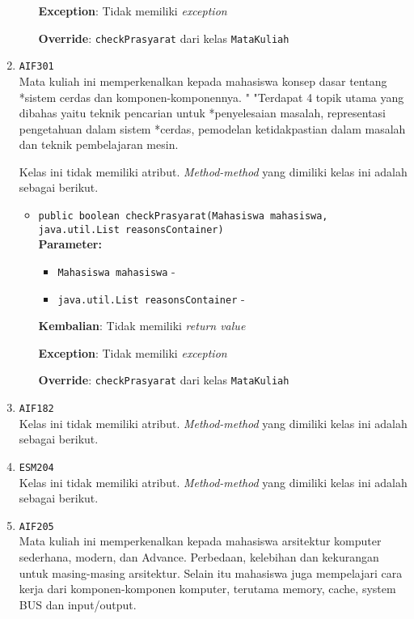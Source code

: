 \documentclass{article}
\begin{document}
\begin{enumerate}
\begin{itemize}
\textbf{Exception}: Tidak memiliki \textit{exception}

\textbf{Override}: \texttt{checkPrasyarat} dari kelas \texttt{MataKuliah}

\end{itemize}
\item \texttt{AIF301}\\ 
Mata kuliah ini memperkenalkan kepada mahasiswa konsep dasar tentang *sistem
 cerdas dan komponen-komponennya. " "Terdapat 4 topik utama yang dibahas yaitu
 teknik pencarian untuk *penyelesaian masalah, representasi pengetahuan dalam
 sistem *cerdas, pemodelan ketidakpastian dalam masalah dan teknik
 pembelajaran mesin.

Kelas ini tidak memiliki atribut. \textit{Method-method} yang dimiliki kelas ini adalah sebagai berikut.
\begin{itemize}
\item \texttt{public boolean checkPrasyarat(Mahasiswa mahasiswa, java.util.List reasonsContainer)}\\ 


\textbf{Parameter:}\begin{itemize}
\item \texttt{Mahasiswa mahasiswa} - 
\item \texttt{java.util.List reasonsContainer} - 
\end{itemize}
\textbf{Kembalian}: Tidak memiliki \textit{return value}

\textbf{Exception}: Tidak memiliki \textit{exception}

\textbf{Override}: \texttt{checkPrasyarat} dari kelas \texttt{MataKuliah}

\end{itemize}
\item \texttt{AIF182}\\ 
Kelas ini tidak memiliki atribut. \textit{Method-method} yang dimiliki kelas ini adalah sebagai berikut.
\begin{itemize}
\end{itemize}
\item \texttt{ESM204}\\ 
Kelas ini tidak memiliki atribut. \textit{Method-method} yang dimiliki kelas ini adalah sebagai berikut.
\begin{itemize}
\end{itemize}
\item \texttt{AIF205}\\ 
Mata kuliah ini memperkenalkan kepada mahasiswa arsitektur komputer 
 sederhana, modern, dan Advance. Perbedaan, kelebihan dan kekurangan untuk 
 masing-masing arsitektur. Selain itu mahasiswa juga mempelajari cara kerja 
 dari komponen-komponen komputer, terutama memory, cache, system BUS dan 
 input/output.


\end{enumerate}
\end{document}
